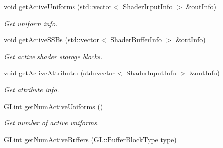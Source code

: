 \begin{Indent}
\begin{DoxyCompactItemize}
\mbox{\label{classrev_1_1_shader_program_aa7a7e11942edde1adc5f36f07780621f}} 
void \mbox{\hyperlink{classrev_1_1_shader_program_aa7a7e11942edde1adc5f36f07780621f}{get\+Active\+Uniforms}} (std\+::vector$<$ \mbox{\hyperlink{structrev_1_1_shader_input_info}{Shader\+Input\+Info}} $>$ \&out\+Info)
\begin{DoxyCompactList}\small\item\em Get uniform info. \end{DoxyCompactList}\item 
\mbox{\label{classrev_1_1_shader_program_a242223b130b40342206f04023675249c}} 
void \mbox{\hyperlink{classrev_1_1_shader_program_a242223b130b40342206f04023675249c}{get\+Active\+S\+S\+Bs}} (std\+::vector$<$ \mbox{\hyperlink{structrev_1_1_shader_buffer_info}{Shader\+Buffer\+Info}} $>$ \&out\+Info)
\begin{DoxyCompactList}\small\item\em Get active shader storage blocks. \end{DoxyCompactList}\item 
\mbox{\label{classrev_1_1_shader_program_ab245e3add4c5c2e4e63b6464f85aab1e}} 
void \mbox{\hyperlink{classrev_1_1_shader_program_ab245e3add4c5c2e4e63b6464f85aab1e}{get\+Active\+Attributes}} (std\+::vector$<$ \mbox{\hyperlink{structrev_1_1_shader_input_info}{Shader\+Input\+Info}} $>$ \&out\+Info)
\begin{DoxyCompactList}\small\item\em Get attribute info. \end{DoxyCompactList}\item 
\mbox{\label{classrev_1_1_shader_program_ab42c439f086659cee123aff552616d8d}} 
G\+Lint \mbox{\hyperlink{classrev_1_1_shader_program_ab42c439f086659cee123aff552616d8d}{get\+Num\+Active\+Uniforms}} ()
\begin{DoxyCompactList}\small\item\em Get number of active uniforms. \end{DoxyCompactList}\item 
\mbox{\label{classrev_1_1_shader_program_aa57bf89f6d03e8798b9873e82ef42162}} 
G\+Lint \mbox{\hyperlink{classrev_1_1_shader_program_aa57bf89f6d03e8798b9873e82ef42162}{get\+Num\+Active\+Buffers}} (G\+L\+::\+Buffer\+Block\+Type type)

\end{DoxyCompactItemize}
\end{Indent}

